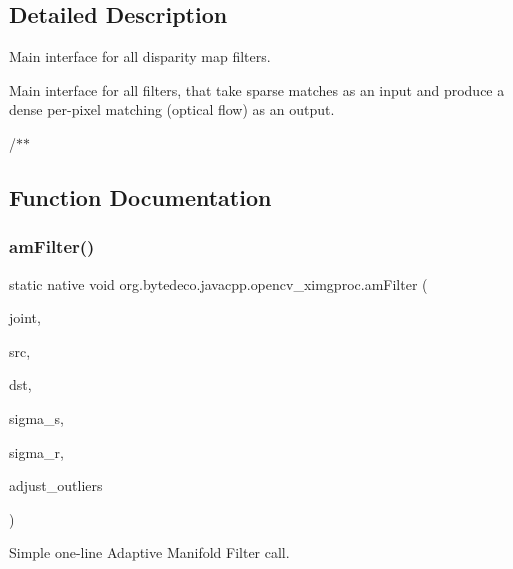 \subsection{Detailed Description}
Main interface for all disparity map filters. 

Main interface for all filters, that take sparse matches as an input and produce a dense per-\/pixel matching (optical flow) as an output.

/$\ast$$\ast$ 

\subsection{Function Documentation}
\mbox{\label{group__ximgproc__filters_ga0555fbee9503a53a6fcc0472db78f188}} 
\subsubsection{\texorpdfstring{am\+Filter()}{amFilter()}}
{\footnotesize\ttfamily static native void org.\+bytedeco.\+javacpp.\+opencv\+\_\+ximgproc.\+am\+Filter (\begin{DoxyParamCaption}\item[{@By\+Val Mat}]{joint,  }\item[{@By\+Val Mat}]{src,  }\item[{@By\+Val Mat}]{dst,  }\item[{double}]{sigma\+\_\+s,  }\item[{double}]{sigma\+\_\+r,  }\item[{@Cast(\char`\"{}bool\char`\"{}) boolean}]{adjust\+\_\+outliers }\end{DoxyParamCaption})\hspace{0.3cm}{\ttfamily [static]}}



Simple one-\/line Adaptive Manifold Filter call. 


